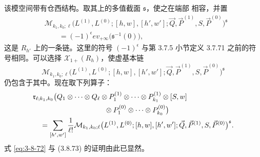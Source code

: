该模空间带有仓西结构。取其上的多值截面 $\mathfrak s$，使之在端部
相容，并置
\[
\begin{aligned}
 &\mathcal M_{k_1,k_0;\ell}
 \bigl(L^{(1)},L^{(0)};[h,w],[h',w'];
 \vec Q,\vec P^{(1)},S,\vec P^{(0)}\bigr)^{\mathfrak s}\\
 &\qquad=
 (-1)^\epsilon ev_{+\infty}
 \bigl(\mathfrak s^{-1}(0)\bigr),
\end{aligned}
\]
这是 $R_{h'}$ 上的一条链。这里的符号 $(-1)^\epsilon$ 与第 3.7.5
小节定义 3.7.71 之前的符号相同。可以选择
$\mathcal X_{1+}(R_h)$，使虚基本链
\[
 \mathcal M_{k_1,k_0;\ell}
 \bigl(L^{(1)},L^{(0)};[h,w],[h',w'];
 \vec Q,\vec P^{(1)},S,\vec P^{(0)}\bigr)^{\mathfrak s}
\]
仍包含于其中。现在取下列算子：
\[
\begin{aligned}
 &\mathfrak r_{\ell;k_1,k_0}
 \bigl(
 Q_1\otimes\cdots\otimes Q_\ell
 \otimes P_1^{(1)}\otimes\cdots\otimes P_{k_1}^{(1)}
 \otimes[S,w]\\
 &\hspace{35mm}{}
 \otimes P_1^{(0)}\otimes\cdots\otimes P_{k_0}^{(0)}
 \bigr)\\
 &\quad=
 \sum_{[h',w']}\frac1{\ell!}
 \mathcal M_{k_1,k_0;\ell}
 \bigl(L^{(1)},L^{(0)};[h,w],[h',w'];
 \vec Q,\vec P^{(1)},S,\vec P^{(0)}\bigr)^{\mathfrak s}.
\end{aligned}
\]
式 \eqref{eq:3-8-72} 与 (3.8.73) 的证明由此已显然。
